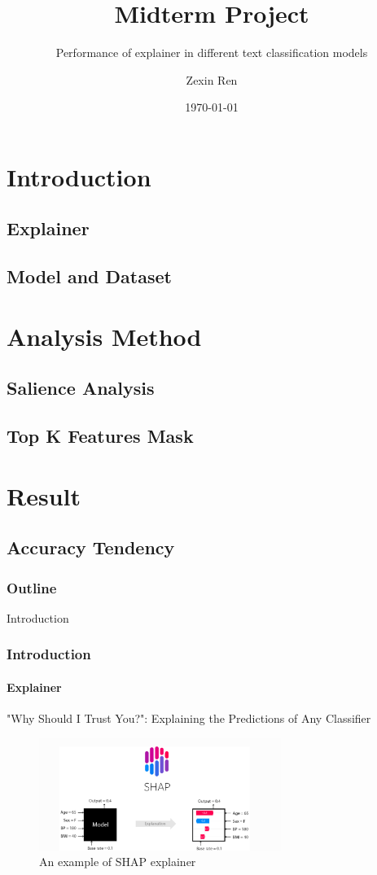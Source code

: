 \documentclass{beamer}
\title{Midterm Project}
\subtitle{Performance of explainer in different text classification models}
\author{Zexin Ren}
\date{\today}
\begin{document}
\begin{frame}
    \titlepage
\end{frame}

\section{Introduction}
\subsection{Explainer}
\subsection{Model and Dataset}
\section{Analysis Method}
\subsection{Salience Analysis}
\subsection{Top K Features Mask}


\section{Result}
\subsection{Accuracy Tendency}



\begin{frame}
    \frametitle{Outline}
    \tableofcontents
\end{frame}


\begin{frame}{Introduction}
\frametitle{Introduction}
\framesubtitle{Explainer}
"Why Should I Trust You?": Explaining the Predictions of Any Classifier
\begin{figure}
    \centering
        \includegraphics[width=0.7\textwidth]{ExplainerIntroduction.png}
        \caption{An example of SHAP explainer}
        \label{fig:ExplainerIntroduction}
    \end{figure}
\end{frame}
\end{document}
